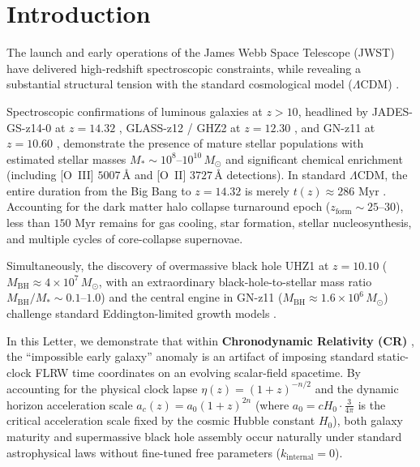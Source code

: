 \documentclass[aps,prd,reprint,superscriptaddress,nofootinbib,floatfix,amsmath,amssymb]{revtex4-2}
\begin{document}
\section{Introduction}
\label{sec:intro}

The launch and early operations of the James Webb Space Telescope (JWST) have delivered high-redshift spectroscopic constraints, while revealing a substantial structural tension with the standard cosmological model ($\Lambda\text{CDM}$) \cite{BoylanKolchin2023_Stress,Ferrara2023_Bright}.

Spectroscopic confirmations of luminous galaxies at $z > 10$, headlined by JADES-GS-z14-0 at $z = 14.32$ \cite{Carniani2024_JADES,Robertson2023_JADES}, GLASS-z12 / GHZ2 at $z = 12.30$ \cite{Castellano2022_GLASS,Castellano2024_GHZ2}, and GN-z11 at $z = 10.60$ \cite{Bunker2023_GNz11}, demonstrate the presence of mature stellar populations with estimated stellar masses $M_* \sim 10^8\text{--}10^{10}\,M_\odot$ and significant chemical enrichment (including [O~III] $5007\,\text{\AA}$ and [O~II] $3727\,\text{\AA}$ detections). In standard $\Lambda\text{CDM}$, the entire duration from the Big Bang to $z = 14.32$ is merely $t(z) \approx 286\text{ Myr}$ \cite{Planck2020_Cosmo}. Accounting for the dark matter halo collapse turnaround epoch ($z_{\text{form}} \sim 25\text{--}30$), less than $150\text{ Myr}$ remains for gas cooling, star formation, stellar nucleosynthesis, and multiple cycles of core-collapse supernovae.

Simultaneously, the discovery of overmassive black hole UHZ1 at $z = 10.10$ ($M_{\text{BH}} \approx 4 \times 10^7\,M_\odot$, with an extraordinary black-hole-to-stellar mass ratio $M_{\text{BH}}/M_* \sim 0.1\text{--}1.0$) \cite{Bogdan2023_UHZ1,Natarajan2024_UHZ1} and the central engine in GN-z11 ($M_{\text{BH}} \approx 1.6 \times 10^6\,M_\odot$) \cite{Maiolino2024_GNz11_BH} challenge standard Eddington-limited growth models \cite{Salpeter1964,Volonteri2010_Review}.

In this Letter, we demonstrate that within \textbf{Chronodynamic Relativity (CR)} \cite{Shreve2026_CR_Foundations}, the ``impossible early galaxy'' anomaly is an artifact of imposing standard static-clock FLRW time coordinates on an evolving scalar-field spacetime. By accounting for the physical clock lapse $\eta(z) = (1+z)^{-n/2}$ and the dynamic horizon acceleration scale $a_c(z) = a_0(1+z)^{2n}$ (where $a_0 = c H_0 \cdot \frac{3}{4\pi}$ is the critical acceleration scale fixed by the cosmic Hubble constant $H_0$), both galaxy maturity and supermassive black hole assembly occur naturally under standard astrophysical laws without fine-tuned free parameters ($k_{\text{internal}} = 0$).
\end{document}
